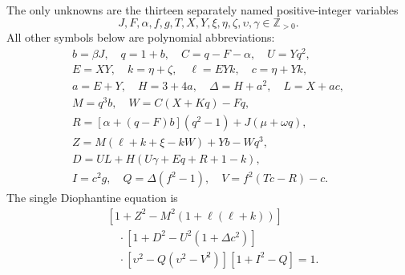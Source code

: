 The only unknowns are the thirteen separately named positive-integer variables
\[
J,F,\alpha,f,g,T,X,Y,\xi,\eta,\zeta,\upsilon,\gamma\in\mathbb Z_{>0}.
\]
All other symbols below are polynomial abbreviations:
\[
\begin{gathered}
b=\beta J,\quad q=1+b,\quad C=q-F-\alpha,\quad U=Yq^2,\\
E=XY,\quad k=\eta+\zeta,\quad \ell=EYk,\quad c=\eta+Yk,\\
a=E+Y,\quad H=3+4a,\quad\Delta=H+a^2,\quad L=X+ac,\\
M=q^3b,\quad W=C(X+Kq)-Fq,\\
R=[\alpha+(q-F)b](q^2-1)+J(\mu+\omega q),\\
Z=M(\ell+k+\xi-kW)+Yb-Wq^3,\\
D=UL+H(U\gamma+Eq+R+1-k),\\
I=c^2g,\quad Q=\Delta(f^2-1),\quad V=f^2(Tc-R)-c.
\end{gathered}
\]
The single Diophantine equation is
\[
\boxed{\begin{aligned}
&[1+Z^2-M^2(1+\ell(\ell+k))]\\
&\quad\cdot[1+D^2-U^2(1+\Delta c^2)]\\
&\quad\cdot[\upsilon^2-Q(\upsilon^2-V^2)]
[1+I^2-Q]=1.
\end{aligned}}
\]
